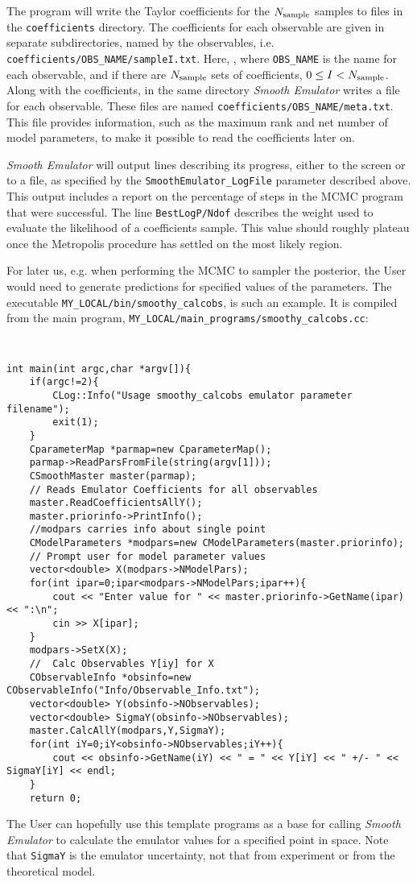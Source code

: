 \documentclass[UserManual.tex]{subfiles}
\begin{document}
The program will write the Taylor coefficients for the $N_{\rm sample}$ samples to files in the {\tt coefficients} directory.  The coefficients for each observable are given in separate subdirectories, named by the observables, i.e. {\tt coefficients/OBS\_NAME/sampleI.txt}. Here, , where {\tt OBS\_NAME} is the name for each observable, and if there are $N_{\rm sample}$ sets of coefficients, $0\le I<N_{\rm sample}$. Along with the coefficients, in the same directory {\it Smooth Emulator} writes a file for each observable. These files are named {\tt coefficients/OBS\_NAME/meta.txt}.  This file provides information, such as the maximum rank and net number of model parameters, to make it possible to read the coefficients later on.

{\it Smooth Emulator} will output lines describing its progress, either to the screen or to a file, as specified by the {\tt SmoothEmulator\_LogFile} parameter described above. This output includes a report on the percentage of steps in the MCMC program that were successful. The line {\tt BestLogP/Ndof} describes the weight used to evaluate the likelihood of a coefficients sample. This value should roughly plateau once the Metropolis procedure has settled on the most likely region.

For later us, e.g. when performing the MCMC to sampler the posterior, the User would need to generate predictions for specified values of the parameters. The executable {\tt MY\_LOCAL/bin/smoothy\_calcobs}, is such an example. It is compiled from the main program, {\tt MY\_LOCAL/main\_programs/smoothy\_calcobs.cc}:
{\tt
\begin{verbatim}
int main(int argc,char *argv[]){
    if(argc!=2){
        CLog::Info("Usage smoothy_calcobs emulator parameter filename");
        exit(1);
    }
    CparameterMap *parmap=new CparameterMap();
    parmap->ReadParsFromFile(string(argv[1]));
    CSmoothMaster master(parmap);
    // Reads Emulator Coefficients for all observables
    master.ReadCoefficientsAllY();
    master.priorinfo->PrintInfo();
    //modpars carries info about single point
    CModelParameters *modpars=new CModelParameters(master.priorinfo);
    // Prompt user for model parameter values
    vector<double> X(modpars->NModelPars);
    for(int ipar=0;ipar<modpars->NModelPars;ipar++){
        cout << "Enter value for " << master.priorinfo->GetName(ipar) << ":\n";
        cin >> X[ipar];
    }
    modpars->SetX(X);
    //  Calc Observables Y[iy] for X
    CObservableInfo *obsinfo=new CObservableInfo("Info/Observable_Info.txt");
    vector<double> Y(obsinfo->NObservables);
    vector<double> SigmaY(obsinfo->NObservables);
    master.CalcAllY(modpars,Y,SigmaY);
    for(int iY=0;iY<obsinfo->NObservables;iY++){
        cout << obsinfo->GetName(iY) << " = " << Y[iY] << " +/- " << SigmaY[iY] << endl;
    }
    return 0;

\end{verbatim}
}
The User can hopefully use this template programs as a base for calling {\it Smooth Emulator} to calculate the emulator values for a specified point in space. Note that {\tt SigmaY} is the emulator uncertainty, not that from experiment or from the theoretical model.
\end{document}
